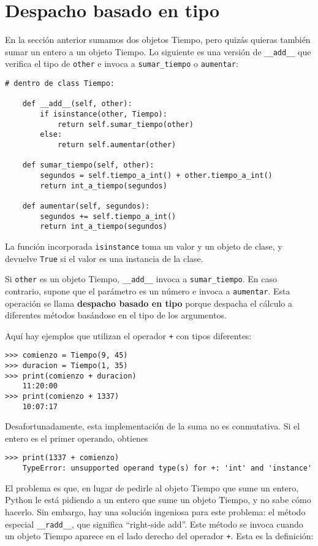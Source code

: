 \documentclass[10pt]{book}
\begin{document}
\section{Despacho basado en tipo}

En la sección anterior sumamos dos objetos Tiempo, pero quizás
quieras también sumar un entero a un objeto Tiempo.  Lo
siguiente es una versión de \verb"__add__"
que verifica el tipo de {\tt other} e invoca a
\verb"sumar_tiempo" o {\tt aumentar}:

\begin{verbatim}
# dentro de class Tiempo:

    def __add__(self, other):
        if isinstance(other, Tiempo):
            return self.sumar_tiempo(other)
        else:
            return self.aumentar(other)

    def sumar_tiempo(self, other):
        segundos = self.tiempo_a_int() + other.tiempo_a_int()
        return int_a_tiempo(segundos)

    def aumentar(self, segundos):
        segundos += self.tiempo_a_int()
        return int_a_tiempo(segundos)
\end{verbatim}
%
La función incorporada {\tt isinstance} toma un valor y un
objeto de clase, y devuelve {\tt True} si el valor es una instancia
de la clase.

Si {\tt other} es un objeto Tiempo, \verb"__add__" invoca a
\verb"sumar_tiempo".  En caso contrario, supone que el parámetro
es un número e invoca a {\tt aumentar}.  Esta operación se
llama {\bf despacho basado en tipo} porque despacha el
cálculo a diferentes métodos basándose en el tipo de los
argumentos.

Aquí hay ejemplos que utilizan el operador {\tt +} con tipos
diferentes:

\begin{verbatim}
>>> comienzo = Tiempo(9, 45)
>>> duracion = Tiempo(1, 35)
>>> print(comienzo + duracion)
    11:20:00
>>> print(comienzo + 1337)
    10:07:17
\end{verbatim}
%
Desafortunadamente, esta implementación de la suma no es conmutativa.
Si el entero es el primer operando, obtienes

\begin{verbatim}
>>> print(1337 + comienzo)
    TypeError: unsupported operand type(s) for +: 'int' and 'instance'
\end{verbatim}
%
El problema es que, en lugar de pedirle al objeto Tiempo que sume un entero,
Python le está pidiendo a un entero que sume un objeto Tiempo, y no sabe
cómo hacerlo.  Sin embargo, hay una solución ingeniosa para este problema: el
método especial \verb"__radd__", que significa ``right-side add''.
Este método se invoca cuando un objeto Tiempo aparece en el lado derecho del
operador {\tt +}.  Esta es la definición:
\end{document}
